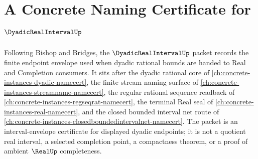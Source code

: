 \chapter{A Concrete Naming Certificate for $\DyadicRealIntervalUp$}
\label{ch:concrete-instances-dyadic-real-interval-namecert}

Following Bishop and Bridges, the $\DyadicRealIntervalUp$ packet records the finite endpoint envelope used when dyadic rational bounds are handed to Real and Completion consumers. It sits after the dyadic rational core of \autoref{ch:concrete-instances-dyadic-namecert}, the finite stream naming surface of \autoref{ch:concrete-instances-streamname-namecert}, the regular rational sequence readback of \autoref{ch:concrete-instances-regseqrat-namecert}, the terminal Real seal of \autoref{ch:concrete-instances-real-namecert}, and the closed bounded interval net route of \autoref{ch:concrete-instances-closedboundedintervalnet-namecert}. The packet is an interval-envelope certificate for displayed dyadic endpoints; it is not a quotient real interval, a selected completion point, a compactness theorem, or a proof of ambient $\RealUp$ completeness.

